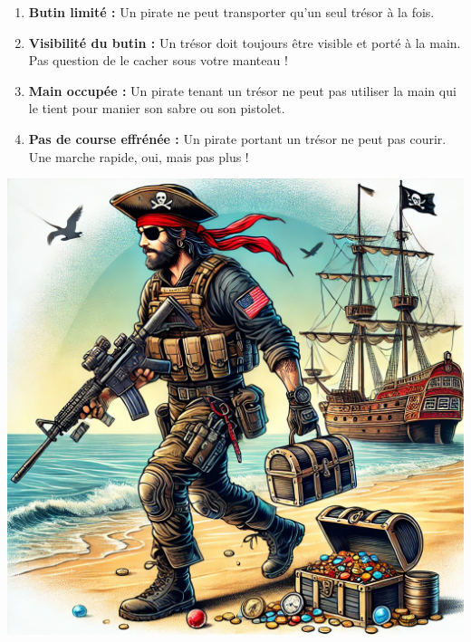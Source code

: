 \documentclass{pirategame}
\begin{document}
\begin{minipage}[t]{0.7\textwidth}
  \textwidth
  \begin{enumerate}[(1),series=rules]
      \item \textbf{Butin limité :} Un pirate ne peut transporter qu’un seul trésor à la fois.
      \item \textbf{Visibilité du butin :} Un trésor doit toujours être visible et porté à la main. Pas question de le cacher sous votre manteau !
      \item \textbf{Main occupée :} Un pirate tenant un trésor ne peut pas utiliser la main qui le tient pour manier son sabre ou son pistolet.
      \item \textbf{Pas de course effrénée :} Un pirate portant un trésor ne peut pas courir. Une marche rapide, oui, mais pas plus !
  \end{enumerate}
\end{minipage}
\hfill
\begin{minipage}[t]{0.28\textwidth}
  \vspace{0em}
  \includegraphics[width=\linewidth]{img/rules-1-2-3-4.png}
\end{minipage}
\end{document}
